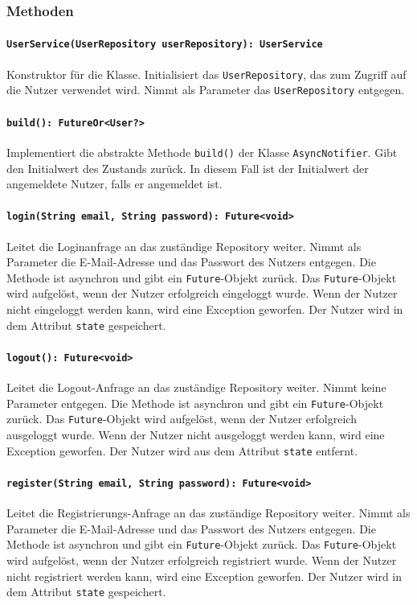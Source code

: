 \documentclass{entwurfsheft}
\begin{document}
\subsubsection*{Methoden}
\paragraph{\texttt{UserService(UserRepository userRepository): UserService}}
Konstruktor für die Klasse. Initialisiert das \texttt{UserRepository}, das zum Zugriff auf die Nutzer verwendet wird. Nimmt als Parameter das \texttt{UserRepository} entgegen.
\paragraph{\texttt{build(): FutureOr<User?>}}
Implementiert die abstrakte Methode \texttt{build()} der Klasse \texttt{Async\-Notifier}. Gibt den Initialwert des Zustands zurück. In diesem Fall ist der Initialwert der angemeldete Nutzer, falls er angemeldet ist.
\paragraph{\texttt{login(String email, String password): Future<void>}}
Leitet die Loginanfrage an das zuständige Repository weiter. Nimmt als Parameter die E-Mail-Adresse und das Passwort des Nutzers entgegen. Die Methode ist asynchron und gibt ein \texttt{Future}-Objekt zurück. Das \texttt{Future}-Objekt wird aufgelöst, wenn der Nutzer erfolgreich eingeloggt wurde. Wenn der Nutzer nicht eingeloggt werden kann, wird eine Exception geworfen. Der Nutzer wird in dem Attribut \texttt{state} gespeichert.
\paragraph{\texttt{logout(): Future<void>}}
Leitet die Logout-Anfrage an das zuständige Repository weiter. Nimmt keine Parameter entgegen. Die Methode ist asynchron und gibt ein \texttt{Future}-Objekt zurück. Das \texttt{Future}-Objekt wird aufgelöst, wenn der Nutzer erfolgreich ausgeloggt wurde. Wenn der Nutzer nicht ausgeloggt werden kann, wird eine Exception geworfen. Der Nutzer wird aus dem Attribut \texttt{state} entfernt.
\paragraph{\texttt{register(String email, String password): Future<void>}}
Leitet die Registrierungs-An\-frage an das zuständige Repository weiter. Nimmt als Parameter die E-Mail-Adresse und das Passwort des Nutzers entgegen. Die Methode ist asynchron und gibt ein \texttt{Future}-Objekt zurück. Das \texttt{Future}-Objekt wird aufgelöst, wenn der Nutzer erfolgreich registriert wurde. Wenn der Nutzer nicht registriert werden kann, wird eine Exception geworfen. Der Nutzer wird in dem Attribut \texttt{state} gespeichert.
\end{document}
